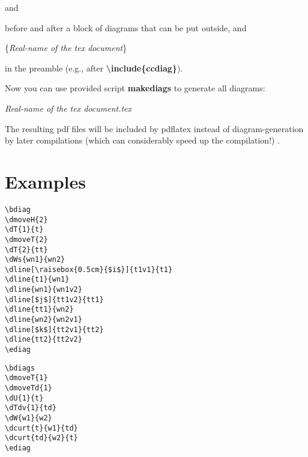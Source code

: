\documentclass[a4paper]{article}
\newcommand{\myind}{\hspace{10pt}}
\begin{document}
and

\myind{\bf \textbackslash endpgfgraphicnamed}

before and after a block of diagrams that can be put outside, and 

\myind{\bf \textbackslash pgfrealjobname}\{{\it Real-name of the tex document}\}

in the preamble (e.g., after {\bf \textbackslash include\{ccdiag\}}).

Now you can use provided script {\bf makediags} to generate all diagrams:

\myind{\bf makediags} {\it Real-name of the tex document.tex}

The resulting pdf files will be included by pdflatex 
instead of diagram-generation by later compilations (which can considerably speed up the compilation!) .

\section{Examples}
 \begin{minipage}[b]{0.5\linewidth}\centering
  \begin{lstlisting}
\bdiag
\dmoveH{2}
\dT{1}{t}
\dmoveT{2}
\dT{2}{tt}
\dWs{wn1}{wn2}
\dline[\raisebox{0.5cm}{$i$}]{t1v1}{t1}
\dline{t1}{wn1}
\dline{wn1}{wn1v2}
\dline[$j$]{tt1v2}{tt1}
\dline{tt1}{wn2}
\dline{wn2}{wn2v1}
\dline[$k$]{tt2v1}{tt2}
\dline{tt2}{tt2v2}
\ediag
  \end{lstlisting}
 \end{minipage}
 \begin{minipage}[b]{0.5\linewidth}\centering
\bdiag
{}
\ediag
 \end{minipage}

 \begin{minipage}[b]{0.5\linewidth}\centering
  \begin{lstlisting}
\bdiags
\dmoveT{1}
\dmoveTd{1}
\dU{1}{t}
\dTdv{1}{td}
\dW{w1}{w2}
\dcurt{t}{w1}{td}
\dcurt{td}{w2}{t}
\ediag
  \end{lstlisting}
 \end{minipage}
 \begin{minipage}[b]{0.5\linewidth}\centering
\bdiags
{}
\ediag
 \end{minipage}
\end{document}
